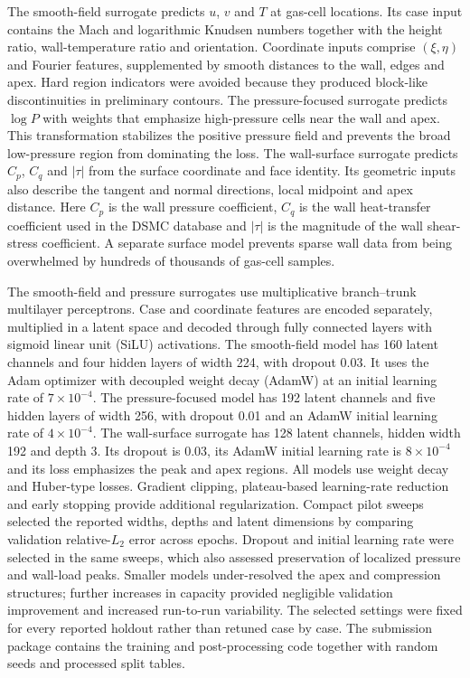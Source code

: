 \documentclass[aip,pof,preprint,notitlepage,floatfix,amsmath,amssymb]{revtex4-2}
\begin{document}
The smooth-field surrogate predicts $u$, $v$ and $T$ at gas-cell locations. Its case input contains the Mach and logarithmic Knudsen numbers together with the height ratio, wall-temperature ratio and orientation. Coordinate inputs comprise $(\xi,\eta)$ and Fourier features, supplemented by smooth distances to the wall, edges and apex. Hard region indicators were avoided because they produced block-like discontinuities in preliminary contours. The pressure-focused surrogate predicts $\log P$ with weights that emphasize high-pressure cells near the wall and apex. This transformation stabilizes the positive pressure field and prevents the broad low-pressure region from dominating the loss. The wall-surface surrogate predicts $C_p$, $C_q$ and $|\tau|$ from the surface coordinate and face identity. Its geometric inputs also describe the tangent and normal directions, local midpoint and apex distance. Here $C_p$ is the wall pressure coefficient, $C_q$ is the wall heat-transfer coefficient used in the DSMC database and $|\tau|$ is the magnitude of the wall shear-stress coefficient. A separate surface model prevents sparse wall data from being overwhelmed by hundreds of thousands of gas-cell samples.

The smooth-field and pressure surrogates use multiplicative branch--trunk multilayer perceptrons. Case and coordinate features are encoded separately, multiplied in a latent space and decoded through fully connected layers with sigmoid linear unit (SiLU) activations. The smooth-field model has 160 latent channels and four hidden layers of width 224, with dropout 0.03. It uses the Adam optimizer with decoupled weight decay (AdamW) at an initial learning rate of $7\times10^{-4}$. The pressure-focused model has 192 latent channels and five hidden layers of width 256, with dropout 0.01 and an AdamW initial learning rate of $4\times10^{-4}$. The wall-surface surrogate has 128 latent channels, hidden width 192 and depth 3. Its dropout is 0.03, its AdamW initial learning rate is $8\times10^{-4}$ and its loss emphasizes the peak and apex regions. All models use weight decay and Huber-type losses. Gradient clipping, plateau-based learning-rate reduction and early stopping provide additional regularization. Compact pilot sweeps selected the reported widths, depths and latent dimensions by comparing validation relative-$L_2$ error across epochs. Dropout and initial learning rate were selected in the same sweeps, which also assessed preservation of localized pressure and wall-load peaks. Smaller models under-resolved the apex and compression structures; further increases in capacity provided negligible validation improvement and increased run-to-run variability. The selected settings were fixed for every reported holdout rather than retuned case by case. The submission package contains the training and post-processing code together with random seeds and processed split tables.
\end{document}
